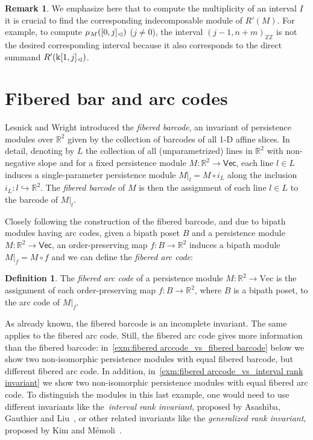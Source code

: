 \documentclass[a4paper,english,reqno]{amsart}
\newcommand{\deff}{\textit}
\renewcommand\k{\Bbbk}
\newcommand\ZZ{\mathbb{ZZ}}
\newcommand\R{\mathbb{R}}
\newcommand{\cat}[1]{\ensuremath{\mathsf{#1}}}
\renewcommand{\Vec}{\cat{Vec}}
\theoremstyle{plain}
\theoremstyle{definition} %
\newtheorem{definition}[theorem]{Definition}
\newtheorem{remark}[theorem]{Remark}
\newcommand{\slice}[1]{{#1}'} %
\begin{document}
\begin{remark}
We emphasize here that to compute the multiplicity of an interval $I$ it is crucial to find the corresponding indecomposable module of $\slice{R}(M)$. For example, to compute $\mu_M([0, j]_{\vartriangleleft})$ ($j\neq 0$), the interval $(j-1, n+m)_{\ZZ}$ is not the desired corresponding interval because it also corresponds to the direct summand $\slice{R}(\k [1, j]_{\lefti})$.
\end{remark}

\section{Fibered bar and arc codes}\label{sec:fibered arccode}
Lesnick and Wright \cite{lesnickInteractiveVisualization2D2015} introduced the
\deff{fibered barcode}, an invariant of persistence modules over $\R^{2}$ given
by the collection of barcodes of all 1-D affine slices. In detail, denoting by $L$
the collection of all (unparametrized) lines in $\R^{2}$ with non-negative slope
and for a fixed persistence module $M\colon\R^{2}\to\Vec$, each line $l\in L$
induces a single-parameter persistence module $M|_{l} = M\circ i_{L}$ along the
inclusion $i_{L}\colon l\hookrightarrow\R^{2}$. The \deff{fibered barcode} of $M$ is then the assignment
of each line $l\in L$ to the barcode of $M|_{l}$.

Closely following the construction of the fibered barcode, and due to bipath
modules having arc codes, given a bipath poset $B$ and a persistence module $M\colon\R^{2}\to\Vec$, an order-preserving
map $f\colon B\to\R^{2}$ induces a bipath module $M|_{f} = M\circ f$ and we can
define the \deff{fibered arc code}:

\begin{definition}\label{def:fibered arccode}
  The \deff{fibered arc code} of a persistence module
  $M\colon \mathbb{R}^{2} \to \text{Vec}$ is the assignment of each
  order-preserving map $f\colon B \to \mathbb{R}^{2}$, where $B$ is a bipath
  poset, to the arc code of $M|_{f}$.
\end{definition}

As already known, the fibered barcode is an incomplete invariant. The same
applies to the fibered arc code. Still, the fibered arc code gives more
information than the fibered barcode: in~\cref{exm:fibered arccode_vs_fibered
  barcode} below we show two non-isomorphic persistence modules with equal
fibered barcode, but different fibered arc code. In addition,
in~\cref{exm:fibered arccode_vs_interval rank invariant} we show two
non-isomorphic persistence modules with equal fibered arc code. To distinguish
the modules in this last example, one would need to use different invariants
like the~\emph{interval rank invariant}, proposed by Asashiba, Gauthier and
Liu~\cite{asashiba2024interval}, or other related invariants like the
\emph{generalized rank invariant}, proposed by Kim and
M\'emoli~\cite{kimGeneralizedPersistenceDiagrams2021}.
\end{document}
